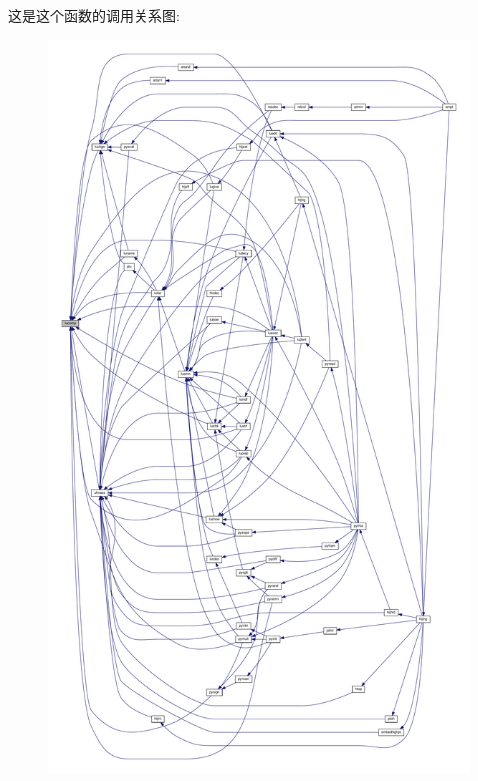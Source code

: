 这是这个函数的调用关系图\+:
\nopagebreak
\begin{figure}[H]
\begin{center}
\leavevmode
\includegraphics[height=550pt]{lucomp_8f90_a49bf81240e363be3c62fc31897fe5a8f_icgraph}
\end{center}
\end{figure}
